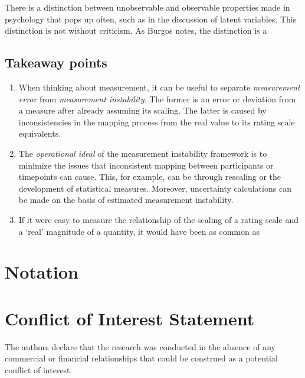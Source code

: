 \documentclass[utf8]{FrontiersinVancouver}
\begin{document}
There is a distinction between unobservable and observable properties made in psychology that pops up often, such as in the discussion of latent variables. This distinction is not without criticism. As Burgos notes, the distinction is a \citep{burgosRealProblemHypothetical2021}

\subsection{Takeaway points}
\begin{enumerate}
    \item{When thinking about measurement, it can be useful to separate \textit{measurement error} from \textit{measurement instability}. The former is an error or deviation from a measure after already assuming its scaling. The latter is caused by inconsistencies in the mapping process from the real value to its rating scale equivalents.}
    \item{The \textit{operational ideal} of the measurement instability framework is to minimize the issues that inconsistent mapping between participants or timepoints can cause. This, for example, can be through rescaling or the development of statistical measures. Moreover, uncertainty calculations can be made on the basis of estimated measurement instability.}
    \item{If it were easy to measure the relationship of the scaling of a rating scale and a `real' magnitude of a quantity, it would have been as common as }
\end{enumerate}


\section*{Notation}

\section*{Conflict of Interest Statement}
The authors declare that the research was conducted in the absence of any commercial or financial relationships that could be construed as a potential conflict of interest.
\end{document}
